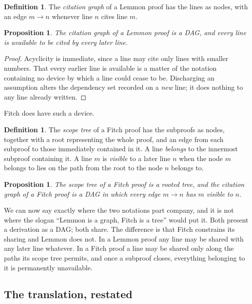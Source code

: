 \documentclass[11pt]{article}
\theoremstyle{plain}
\newtheorem{proposition}[theorem]{Proposition}
\theoremstyle{definition}
\newtheorem{definition}[theorem]{Definition}
\theoremstyle{remark}
\begin{document}
\begin{definition}
The \emph{citation graph} of a Lemmon proof has the lines as nodes, with an
edge $m \to n$ whenever line $n$ cites line $m$.
\end{definition}

\begin{proposition}\label{prop:lemmondag}
The citation graph of a Lemmon proof is a DAG, and every line is available to
be cited by every later line.
\end{proposition}

\begin{proof}
Acyclicity is immediate, since a line may cite only lines with smaller
numbers. That every earlier line is available is a matter of the notation
containing no device by which a line could cease to be. Discharging an
assumption alters the dependency set recorded on a \emph{new} line; it does
nothing to any line already written.
\end{proof}

Fitch does have such a device.

\begin{definition}
The \emph{scope tree} of a Fitch proof has the subproofs as nodes, together
with a root representing the whole proof, and an edge from each subproof to
those immediately contained in it. A line \emph{belongs} to the innermost
subproof containing it. A line $m$ is \emph{visible} to a later line $n$ when
the node $m$ belongs to lies on the path from the root to the node $n$ belongs
to.
\end{definition}

\begin{proposition}\label{prop:fitchtree}
The scope tree of a Fitch proof is a rooted tree, and the citation graph of a
Fitch proof is a DAG in which every edge $m \to n$ has $m$ visible to $n$.
\end{proposition}

We can now say exactly where the two notations part company, and it is not
where the slogan ``Lemmon is a graph, Fitch is a tree'' would put it. Both
present a derivation as a DAG; both share. The difference is that Fitch
constrains its sharing and Lemmon does not. In a Lemmon proof any line may be
shared with any later line whatever. In a Fitch proof a line may be shared
only along the paths its scope tree permits, and once a subproof closes,
everything belonging to it is permanently unavailable.

\subsection{The translation, restated}
\end{document}
